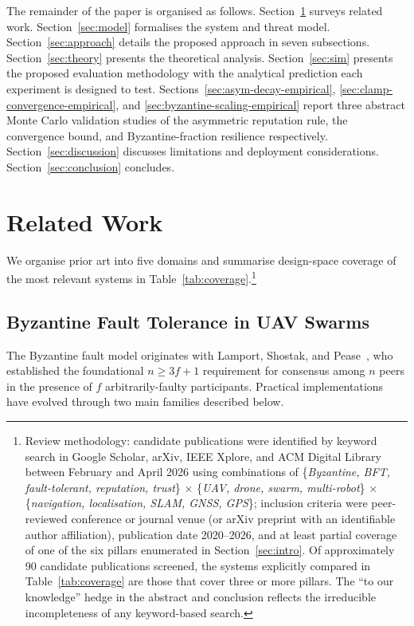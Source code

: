 \documentclass[conference,10pt]{IEEEtran}
\begin{document}
The remainder of the paper is organised as follows. Section~\ref{sec:related} surveys related work. Section~\ref{sec:model} formalises the system and threat model. Section~\ref{sec:approach} details the proposed approach in seven subsections. Section~\ref{sec:theory} presents the theoretical analysis. Section~\ref{sec:sim} presents the proposed evaluation methodology with the analytical prediction each experiment is designed to test. Sections~\ref{sec:asym-decay-empirical}, \ref{sec:clamp-convergence-empirical}, and \ref{sec:byzantine-scaling-empirical} report three abstract Monte Carlo validation studies of the asymmetric reputation rule, the convergence bound, and Byzantine-fraction resilience respectively. Section~\ref{sec:discussion} discusses limitations and deployment considerations. Section~\ref{sec:conclusion} concludes.

\section{Related Work}
\label{sec:related}

We organise prior art into five domains and summarise design-space coverage of the most relevant systems in Table~\ref{tab:coverage}.\footnote{Review methodology: candidate publications were identified by keyword search in Google Scholar, arXiv, IEEE Xplore, and ACM Digital Library between February and April 2026 using combinations of \{\emph{Byzantine, BFT, fault-tolerant, reputation, trust}\} $\times$ \{\emph{UAV, drone, swarm, multi-robot}\} $\times$ \{\emph{navigation, localisation, SLAM, GNSS, GPS}\}; inclusion criteria were peer-reviewed conference or journal venue (or arXiv preprint with an identifiable author affiliation), publication date 2020--2026, and at least partial coverage of one of the six pillars enumerated in Section~\ref{sec:intro}. Of approximately 90 candidate publications screened, the systems explicitly compared in Table~\ref{tab:coverage} are those that cover three or more pillars. The ``to our knowledge'' hedge in the abstract and conclusion reflects the irreducible incompleteness of any keyword-based search.}

\subsection{Byzantine Fault Tolerance in UAV Swarms}

The Byzantine fault model originates with Lamport, Shostak, and Pease~\cite{lamport1982byzantine}, who established the foundational $n \geq 3f+1$ requirement for consensus among $n$ peers in the presence of $f$ arbitrarily-faulty participants. Practical implementations have evolved through two main families described below.
\end{document}
